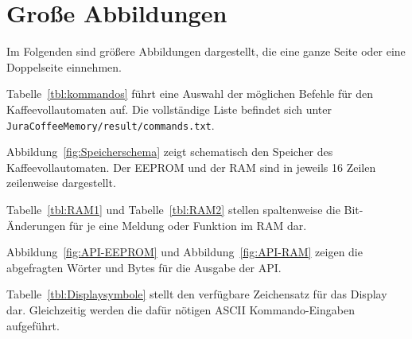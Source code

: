 \chapter{Große Abbildungen}
Im Folgenden sind größere Abbildungen dargestellt, die eine ganze Seite oder eine Doppelseite einnehmen.

\noindent Tabelle~\ref{tbl:kommandos} führt eine Auswahl der möglichen Befehle für den Kaffeevollautomaten auf.
Die vollständige Liste befindet sich unter \texttt{JuraCoffeeMemory/result/commands.txt}.

\noindent Abbildung~\ref{fig:Speicherschema} zeigt schematisch den Speicher des Kaffeevollautomaten.
Der \ac{EEPROM} und der \ac{RAM} sind in jeweils 16 Zeilen zeilenweise dargestellt.

\noindent Tabelle~\ref{tbl:RAM1} und Tabelle~\ref{tbl:RAM2} stellen spaltenweise die Bit-Änderungen für je eine Meldung oder Funktion im \ac{RAM} dar.

\noindent Abbildung~\ref{fig:API-EEPROM} und Abbildung~\ref{fig:API-RAM} zeigen die abgefragten Wörter und Bytes für die Ausgabe der \ac{API}.

\noindent Tabelle~\ref{tbl:Displaysymbole} stellt den verfügbare Zeichensatz für das Display dar.
Gleichzeitig werden die dafür nötigen \ac{ASCII} Kommando-Eingaben aufgeführt.


